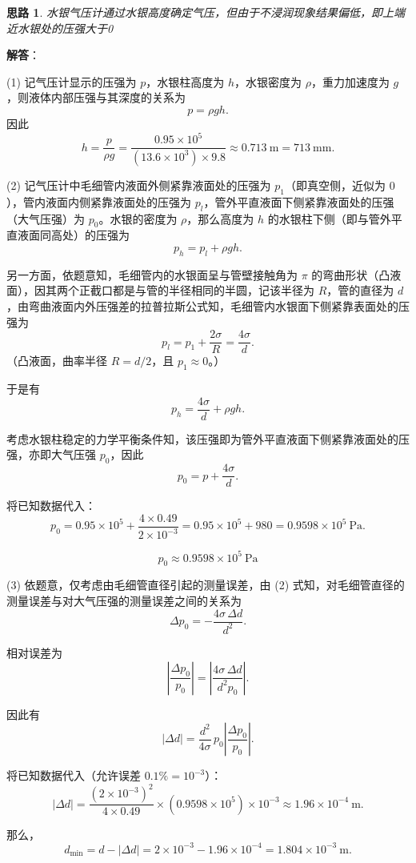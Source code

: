 \documentclass[UTF8]{ctexart}
\newtheorem{thoughts}{思路}[subsection]
\begin{document}
\begin{thoughts}
  水银气压计通过水银高度确定气压，但由于不浸润现象结果偏低，即上端近水银处的压强大于0
\end{thoughts}

\textbf{解答}：

(1) 记气压计显示的压强为 $p$，水银柱高度为 $h$，水银密度为 $\rho$，重力加速度为 $g$，则液体内部压强与其深度的关系为
\[
p=\rho gh.
\]
因此
\[
h=\frac{p}{\rho g}=\frac{0.95\times 10^{5}}{(13.6\times 10^{3})\times 9.8}\approx 0.713\ \mathrm{m}=713\ \mathrm{mm}.
\]

(2) 记气压计中毛细管内液面外侧紧靠液面处的压强为 $p_1$（即真空侧，近似为 $0$），管内液面内侧紧靠液面处的压强为 $p_l$，管外平直液面下侧紧靠液面处的压强（大气压强）为 $p_0$。水银的密度为 $\rho$，那么高度为 $h$ 的水银柱下侧（即与管外平直液面同高处）的压强为
\[
p_h=p_l+\rho gh.
\]

另一方面，依题意知，毛细管内的水银面呈与管壁接触角为 $\pi$ 的弯曲形状（凸液面），因其两个正截口都是与管的半径相同的半圆，记该半径为 $R$，管的直径为 $d$，由弯曲液面内外压强差的拉普拉斯公式知，毛细管内水银面下侧紧靠表面处的压强为
\[
p_l=p_1+\frac{2\sigma}{R}=\frac{4\sigma}{d}.
\]
（凸液面，曲率半径 $R=d/2$，且 $p_1\approx 0$。）

于是有
\[
p_h=\frac{4\sigma}{d}+\rho gh.
\]

考虑水银柱稳定的力学平衡条件知，该压强即为管外平直液面下侧紧靠液面处的压强，亦即大气压强 $p_0$，因此
\[
p_0=p+\frac{4\sigma}{d}.
\]

将已知数据代入：
\[
p_0=0.95\times 10^{5}+\frac{4\times 0.49}{2\times 10^{-3}}
=0.95\times 10^{5}+980
=0.9598\times 10^{5}\ \mathrm{Pa}.
\]

\[
\boxed{p_0\approx 0.9598\times 10^{5}\ \mathrm{Pa}}
\]

(3) 依题意，仅考虑由毛细管直径引起的测量误差，由 (2) 式知，对毛细管直径的测量误差与对大气压强的测量误差之间的关系为
\[
\Delta p_0=-\frac{4\sigma\,\Delta d}{d^2}.
\]

相对误差为
\[
\left|\frac{\Delta p_0}{p_0}\right|=\left|\frac{4\sigma\,\Delta d}{d^2 p_0}\right|.
\]

因此有
\[
|\Delta d|=\frac{d^2}{4\sigma}\,p_0\left|\frac{\Delta p_0}{p_0}\right|.
\]

将已知数据代入（允许误差 $0.1\%=10^{-3}$）：
\[
|\Delta d|=\frac{(2\times 10^{-3})^2}{4\times 0.49}\times(0.9598\times 10^{5})\times 10^{-3}
\approx 1.96\times 10^{-4}\ \mathrm{m}.
\]

那么，
\[
d_{\min}=d-|\Delta d|=2\times 10^{-3}-1.96\times 10^{-4}=1.804\times 10^{-3}\ \mathrm{m}.
\]
\end{document}
